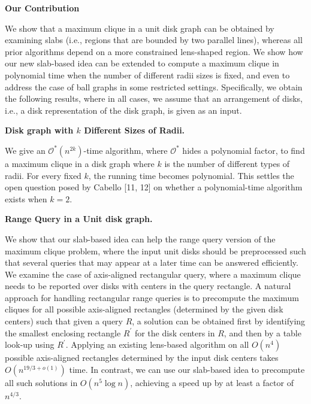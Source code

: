 \documentclass[10pt,a4paper]{amsart}
\begin{document}
\par
\par
\par\medskip\noindent\textbf{Our Contribution}\par
We show that a maximum clique in a unit disk graph can be obtained by examining slabs (i.e., regions that are bounded by two parallel lines), whereas all prior algorithms depend on a more constrained lens-shaped region. We show how our new slab-based idea can be extended to compute a maximum clique in polynomial time when the number of different radii sizes is fixed, and even to address the case of ball graphs in some restricted settings. Specifically, we obtain the following results, where in all cases, we assume that an arrangement of disks, i.e., a disk representation of the disk graph, is given as an input.
\par
\par
\par\medskip\noindent\textbf{Disk graph with $k$ Different Sizes of Radii.}\par
We give an $\mathcal{O}^{*}(n^{2k})$-time algorithm, where $\mathcal{O}^{*}$ hides a polynomial factor, to find a maximum clique in a disk graph where $k$ is the number of different types of radii. For every fixed $k$, the running time becomes polynomial. This settles the open question posed by Cabello [11, 12] on whether a polynomial-time algorithm exists when $k=2$.
\par
\par
\par
\par\medskip\noindent\textbf{Range Query in a Unit disk graph.}\par
We show that our slab-based idea can help the range query version of the maximum clique problem, where the input unit disks should be preprocessed such that several queries that may appear at a later time can be answered efficiently. We examine the case of axis-aligned rectangular query, where a maximum clique needs to be reported over disks with centers in the query rectangle. A natural approach for handling rectangular range queries is to precompute the maximum cliques for all possible axis-aligned rectangles (determined by the given disk centers) such that given a query $R$, a solution can be obtained first by identifying the smallest enclosing rectangle $R^{\prime}$ for the disk centers in $R$, and then by a table look-up using $R^{\prime}$. Applying an existing lens-based algorithm on all $O(n^{4})$ possible axis-aligned rectangles determined by the input disk centers takes $O(n^{19/3+o(1)})$ time. In contrast, we can use our slab-based idea to precompute all such solutions in $O(n^{5}\log n)$, achieving a speed up by at least a factor of $n^{4/3}$.
\end{document}
